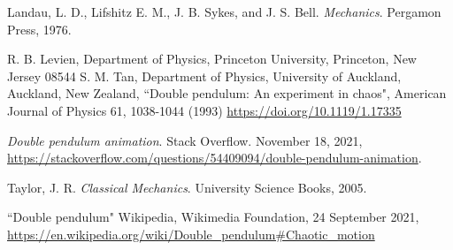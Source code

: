 \documentclass[11pt]{article}
\begin{document}
\begin{thebibliography}{1}

 Landau, L. D., Lifshitz E. M., J. B. Sykes, and J. S. Bell. \textit{Mechanics}. Pergamon Press, 1976.

 R. B. Levien, Department of Physics, Princeton University, Princeton, New Jersey 08544 S. M. Tan, Department of
Physics, University of Auckland, Auckland, New Zealand, ``Double pendulum: An experiment in chaos", American Journal of Physics 61,
1038-1044 (1993) \url{https://doi.org/10.1119/1.17335}

 \textit{Double pendulum animation}. Stack Overflow. November 18, 2021,
\url{ https://stackoverflow.com/questions/54409094/double-pendulum-animation}.

 Taylor, J. R. \textit{Classical Mechanics}. University Science Books, 2005.

 ``Double pendulum" Wikipedia, Wikimedia Foundation, 24 September 2021,
\url{https://en.wikipedia.org/wiki/Double_pendulum#Chaotic_motion}


\end{thebibliography}
\end{document}
